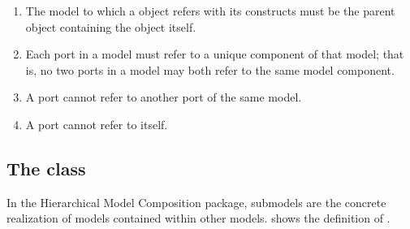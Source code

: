 \begin{enumerate}

  \item The model to which a \Port object refers with its \SBaseRef constructs
    must be the parent \Model object containing the \Port object itself.

  \item Each port in a model must refer to a unique component of that
    model; that is, no two ports in a model may both refer to the same
    model component.

  \item A port cannot refer to another port of the same model.

  \item A port cannot refer to itself.
    
\end{enumerate}
  
%


\subsection{The  class}
\label{submodel-class}
\label{listofdeletions-class}

In the Hierarchical Model Composition package, submodels are the
concrete realization of models contained within other models.
 shows the definition of \Submodel.

